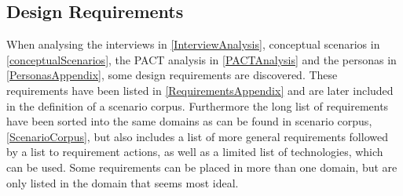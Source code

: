 \subsection{Design Requirements} \label{DesignRequirements}
When analysing the interviews in \cref{InterviewAnalysis}, conceptual scenarios in \cref{conceptualScenarios}, the PACT analysis in \cref{PACTAnalysis} and the personas in \cref{PersonasAppendix}, some design requirements are discovered. These requirements have been listed in \cref{RequirementsAppendix} and are later included in the definition of a scenario corpus. Furthermore the long list of requirements have been sorted into the same domains as can be found in scenario corpus, \cref{ScenarioCorpus}, but also includes a list of more general requirements followed by a list to requirement actions, as well as a limited list of technologies, which can be used. Some requirements can be placed in more than one domain, but are only listed in the domain that seems most ideal.